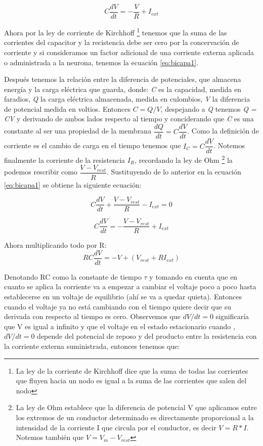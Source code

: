 \begin{equation*}
    C\dfrac{dV}{dt} = -\dfrac{V}{R} + I_{ext} 
\end{equation*}

Ahora por la ley de corriente de Kirchhoff \footnote{La ley de la corriente de Kirchhoff dice que la suma de todas las corrientes que fluyen hacia un nodo es igual a la suma de las corrientes que salen del nodo} tenemos que la suma de las corrientes del capacitor y la recistencia debe ser cero
por la concervación de corriente y si consideramos un factor adicional de una corriente externa aplicada o administrada a la neurona, tenemos la ecuación \ref{eq:bicapa1}.

Después tenemos la relación entre la diferencia de potenciales, que almacena energía y la carga eléctrica que guarda, donde: \emph{C} es la capacidad, medida en faradios, \emph{Q} la carga eléctrica almacenada, medida en culombios, \emph{V} la diferencia de potencial medida en voltios. Entonces \(C = Q/V\), despejando a \emph{Q} tenemos \emph{Q = CV} y derivando de ambos lados respecto al tiempo y conciderando que \emph{C} es una constante al ser una propiedad de la membrana \(\dfrac{dQ}{dt} = C\dfrac{dV}{dt}\). Como la definición de corriente es el cambio de carga en el tiempo tenemos que \(I_{C} = C\dfrac{dV}{dt}\). Notemos finalmente la corriente de la resistencia \(I_{R}\), recordando la ley de Ohm \footnote{La ley de Ohm establece que la diferencia de potencial V que aplicamos entre los extremos de un conductor determinado es directamente proporcional a la intensidad de la corriente I que circula por el conductor, es decir \(V = R * I\). Notemos también que \(V = V_{m} - V_{rest}\) } la podemos rescribir como \(\dfrac{V-V_{rest}}{R}\). Sustituyendo de lo anterior en la ecuación \ref{eq:bicapa1} se obtiene la siguiente ecuación:

\begin{equation}
 C\dfrac{dV}{dt} + \dfrac{V-V_{rest}}{R} - I_{ext} = 0
 \label{eq:bicapa3}
\end{equation}

\begin{equation*}
 C\dfrac{dV}{dt} = -\dfrac{V-V_{rest}}{R} + I_{ext} 
\end{equation*}

Ahora multiplicando todo por R:
\begin{equation}
 RC\dfrac{dV}{dt} = -V + (V_{rest} + RI_{ext}) 
 \label{eq:bicapa4}
\end{equation}

Denotando RC como la constante de tiempo \(\tau\) y tomando en cuenta que en cuanto se aplica la corriente va a empezar a cambiar el voltaje poco a poco hasta establecerse en un voltaje de equilibrio (ahí se va a quedar quieta). Entonces cuando el voltaje ya no está cambiando con el tiempo quiere decir que su derivada con respecto al tiempo es cero. Observemos que \(dV/dt = 0\) significaría que V es igual a infinito y que el voltaje en el estado estacionario cuando , \(dV/dt = 0\) depende del potencial de reposo y del producto entre la resistencia con la corriente externa suministrada, entonces tenemos que:

